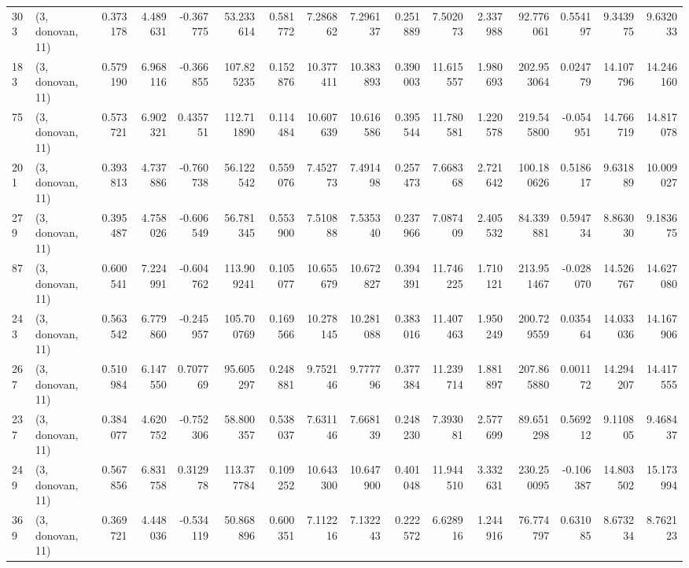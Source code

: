 \begin{tabular}{llrrrrrrrrrrrrrr}
303 &  (3, donovan, 11) &   0.373178 &   4.489631 &  -0.367775 &    53.233614 &   0.581772 &   7.286862 &   7.296137 &  0.251889 &   7.502073 &   2.337988 &    92.776061 &  0.554197 &   9.343975 &   9.632033 \\
183 &  (3, donovan, 11) &   0.579190 &   6.968116 &  -0.366855 &   107.825235 &   0.152876 &  10.377411 &  10.383893 &  0.390003 &  11.615557 &   1.980693 &   202.953064 &  0.024779 &  14.107796 &  14.246160 \\
75  &  (3, donovan, 11) &   0.573721 &   6.902321 &   0.435751 &   112.711890 &   0.114484 &  10.607639 &  10.616586 &  0.395544 &  11.780581 &   1.220578 &   219.545800 & -0.054951 &  14.766719 &  14.817078 \\
201 &  (3, donovan, 11) &   0.393813 &   4.737886 &  -0.760738 &    56.122542 &   0.559076 &   7.452773 &   7.491498 &  0.257473 &   7.668368 &   2.721642 &   100.180626 &  0.518617 &   9.631889 &  10.009027 \\
279 &  (3, donovan, 11) &   0.395487 &   4.758026 &  -0.606549 &    56.781345 &   0.553900 &   7.510888 &   7.535340 &  0.237966 &   7.087409 &   2.405532 &    84.339881 &  0.594734 &   8.863030 &   9.183675 \\
87  &  (3, donovan, 11) &   0.600541 &   7.224991 &  -0.604762 &   113.909241 &   0.105077 &  10.655679 &  10.672827 &  0.394391 &  11.746225 &   1.710121 &   213.951467 & -0.028070 &  14.526767 &  14.627080 \\
243 &  (3, donovan, 11) &   0.563542 &   6.779860 &  -0.245957 &   105.700769 &   0.169566 &  10.278145 &  10.281088 &  0.383016 &  11.407463 &   1.950249 &   200.729559 &  0.035464 &  14.033036 &  14.167906 \\
267 &  (3, donovan, 11) &   0.510984 &   6.147550 &   0.707769 &    95.605297 &   0.248881 &   9.752146 &   9.777796 &  0.377384 &  11.239714 &   1.881897 &   207.865880 &  0.001172 &  14.294207 &  14.417555 \\
237 &  (3, donovan, 11) &   0.384077 &   4.620752 &  -0.752306 &    58.800357 &   0.538037 &   7.631146 &   7.668139 &  0.248230 &   7.393081 &   2.577699 &    89.651298 &  0.569212 &   9.110805 &   9.468437 \\
249 &  (3, donovan, 11) &   0.567856 &   6.831758 &   0.312978 &   113.377784 &   0.109252 &  10.643300 &  10.647900 &  0.401048 &  11.944510 &   3.332631 &   230.250095 & -0.106387 &  14.803502 &  15.173994 \\
369 &  (3, donovan, 11) &   0.369721 &   4.448036 &  -0.534119 &    50.868896 &   0.600351 &   7.112216 &   7.132243 &  0.222572 &   6.628916 &   1.244916 &    76.774797 &  0.631085 &   8.673234 &   8.762123 \\

\end{tabular}
